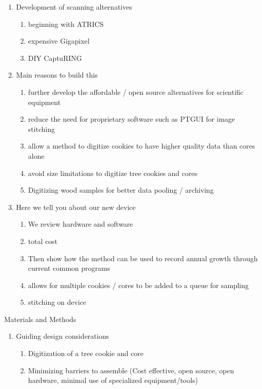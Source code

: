 \documentclass{article}
\begin{document}
\begin{outline}[enumerate]
\begin{enumerate}
\begin{enumerate}
\begin{enumerate}
		\end{enumerate}
		\end{enumerate}
	\item Development of scanning alternatives 
		\begin{enumerate}
		\item beginning with ATRICS
		\item expensive Gigapixel
		\item DIY CaptuRING
		\end{enumerate}
	\item Main reasons to build this 
		\begin{enumerate} 
		\item further develop the affordable / open source alternatives for scientific equipment
		\item reduce the need for proprietary software such as PTGUI for image stitching
		\item allow a method to digitize cookies to have higher quality data than cores alone
		\item avoid size limitations to digitize tree cookies and cores 
		\item Digitizing wood samples for better data pooling / archiving
		\end{enumerate} 
	\item Here we tell you about our new device
		\begin{enumerate}
		\item We review hardware and software 
		\item total cost
		\item Then show how the method can be used to record annual growth through current common programs 
		\item allows for multiple cookies / cores to be added to a queue for sampling
		\item stitching on device 
		\end{enumerate}
	\end{enumerate}
\item Materials and Methods
		\begin{enumerate}
		\item Guiding design considerations
			\begin{enumerate}
				\item Digitization of a tree cookie and core
				\item Minimizing barriers to assemble (Cost effective, open source, open hardware, minimal use of specialized equipment/tools)

\end{enumerate}
\end{enumerate}
\end{outline}
\end{document}
